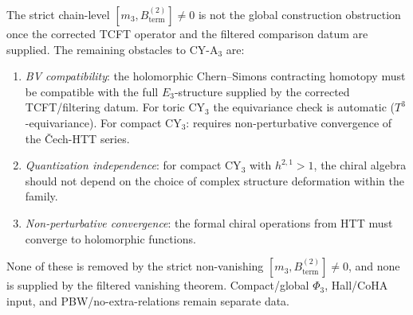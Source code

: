 \begin{remark}
\label{rem:actual-obstructions}
The strict chain-level
$[m_3, B^{(2)}_{\mathrm{term}}] \neq 0$ is not the global
construction obstruction once the corrected TCFT operator and the
filtered comparison datum are supplied.  The remaining obstacles
to CY-A$_3$ are:
\begin{enumerate}[label=\textup{(\roman*)}]
 \item \emph{BV compatibility}: the holomorphic Chern--Simons
 contracting homotopy must be compatible with the full
 $E_3$-structure supplied by the corrected TCFT/filtering datum.
 For toric CY$_3$ the equivariance check is automatic
 ($T^3$-equivariance). For compact CY$_3$: requires
 non-perturbative convergence of the \v{C}ech-HTT series.
 \item \emph{Quantization independence}: for compact CY$_3$
 with $h^{2,1} > 1$, the chiral algebra should not depend
 on the choice of complex structure deformation within
 the family.
 \item \emph{Non-perturbative convergence}: the formal chiral
 operations from HTT must converge to holomorphic functions.
\end{enumerate}
None of these is removed by the strict non-vanishing
$[m_3, B^{(2)}_{\mathrm{term}}] \neq 0$, and none is supplied by
the filtered vanishing theorem.  Compact/global $\Phi_3$, Hall/CoHA
input, and PBW/no-extra-relations remain separate data.
\end{remark}

